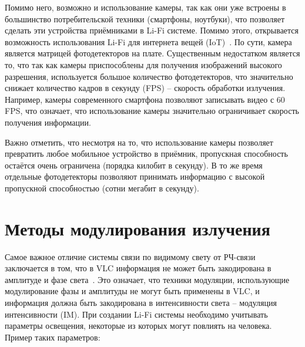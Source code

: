 
Помимо него, возможно и использование камеры, так как они уже встроены в большинство потребительской техники (смартфоны, ноутбуки), что позволяет сделать эти устройства приёмниками в Li-Fi системе. Помимо этого, открывается возможность использования Li-Fi для интернета вещей (IoT)~\cite{Duquel2018}. По сути, камера является матрицей фотодетекторов на плате. Существенным недостатком является то, что так как камеры приспособлены для получения изображений высокого разрешения, используется большое количество фотодетекторов, что значительно снижает количество кадров в секунду (FPS) \--- скорость обработки излучения. Например, камеры современного смартфона позволяют записывать видео с 60 FPS, что означает, что использование камеры значительно ограничивает скорость получения информации. 

Важно отметить, что несмотря на то, что использование камеры позволяет превратить любое мобильное устройство в приёмник, пропускная способность остаётся очень ограничена (порядка килобит в секунду). В то же время отдельные фотодетекторы позволяют принимать информацию с высокой пропускной способностью (сотни мегабит в секунду).

\section{Методы модулирования излучения}


Самое важное отличие системы связи по видимому свету от РЧ-связи заключается в том, что в VLC информация не может быть закодирована в амплитуде и фазе света~\cite{Tsonev2013}. Это означает, что техники модуляции, использующие модулирование фазы и амплитуды не могут быть применены в VLC, и информация должна быть закодирована в интенсивности света \--- модуляция интенсивности (IM). При создании Li-Fi системы необходимо учитывать параметры освещения, некоторые из которых могут повлиять на человека. Пример таких параметров: 

